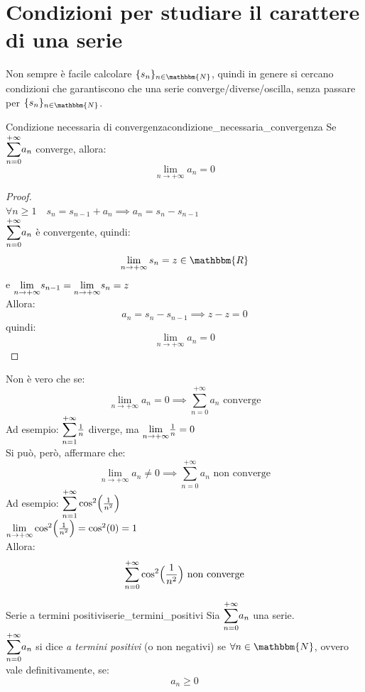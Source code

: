 \documentclass[12pt]{report}
\newcounter{theorem}
\newcounter{definition}
\newcommand{\nmu}{}
\begin{document}
 		\section{Condizioni per studiare il carattere di una serie}
 		Non sempre è facile calcolare $\{s_n\}_{n\in\mathbbm{N}}$, quindi in genere si cercano condizioni che garantiscono che una serie converge/diverse/oscilla, senza passare per $\{s_n\}_{n\in\mathbbm{N}}$. \\
 		\begin{theorem}{\nmu Condizione necessaria di convergenza}{condizione_necessaria_convergenza}
 			Se $\mathlarger{\sum_{n=0}^{+\infty}}a_n$ converge, allora:
 			\[
 			\lim_{n \to +\infty}a_n = 0
 			\]
 			\begin{proof} \quad \\
 				$\forall n \geq 1 \quad s_n = s_{n-1}+a_n \implies a_n = s_n - s_{n-1}$\\
 				 $\mathlarger{\sum_{n=0}^{+\infty}}a_n$ è convergente, quindi:
 				\[
 				\lim_{n \to +\infty}s_n = z \in \mathbbm{R}
 				\]
 				e $\mathlarger{\lim_{n \to +\infty}}s_{n-1}=\mathlarger{\lim_{n \to +\infty}}s_n = z$ \\
 				Allora: \[
 				a_n = s_n - s_{n-1} \implies z - z = 0
 				\]
 				quindi:
 				\[
 				\lim_{n \to +\infty}a_n = 0
 				\]
 			\end{proof}
 		\end{theorem}
 		\begin{note}{}{}
 			Non è vero che se:
 			\[
 			\lim_{n \to +\infty}a_n=0 \implies \sum_{n=0}^{+\infty}a_n \text{ converge}
 			\]
 			Ad esempio: $\mathlarger{\sum_{n=1}^{+\infty}}\frac{1}{n}$ diverge, ma $\mathlarger{\lim_{n \to +\infty}}\frac{1}{n} = 0$ \\
 			Si può, però, affermare che:
 			\[
 			\lim_{n \to +\infty}a_n \neq 0 \implies \sum_{n=0}^{+\infty}a_n \text{ non converge}
 			\]
 			Ad esempio:
 			$
 			\mathlarger{\sum_{n=1}^{+\infty}}\cos^2\Bigl(\frac{1}{n^2}\Bigr)
 			$ \\
 			$\mathlarger{\lim_{n \to +\infty}}\cos^2\Bigl(\frac{1}{n^2}\Bigr) = \cos^2(0) = 1$ \\
 			Allora:
 			\[
 			\sum_{n=0}^{+\infty}\cos^2\Bigl(\frac{1}{n^2}\Bigr) \text{ non converge}
 			\]
 		\end{note}
 		\begin{definition}{\nmu Serie a termini positivi}{serie_termini_positivi}
 			Sia $\mathlarger{\sum_{n=0}^{+\infty}}a_n$ una serie. \\
 			$\mathlarger{\sum_{n=0}^{+\infty}}a_n$ si dice \textit{a termini positivi} (o non negativi) se $\forall n \in \mathbbm{N}$, ovvero vale definitivamente, se:
 			\[
 			a_n \geq 0
 			\]
 		\end{definition}
\end{document}
